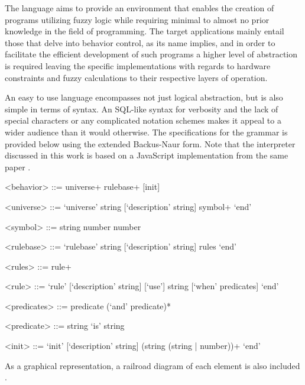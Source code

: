 The language aims to provide an environment that enables the creation of programs utilizing fuzzy logic while requiring minimal to almost no prior knowledge in the field of programming. The target applications mainly entail those that delve into behavior control, as its name implies, and in order to facilitate the efficient development of such programs a higher level of abstraction is required leaving the specific implementations with regards to hardware constraints and fuzzy calculations to their respective layers of operation.

An easy to use language encompasses not just logical abstraction, but is also simple in terms of syntax.
An SQL-like syntax for verbosity and the lack of special characters or any complicated notation schemes makes it appeal to a wider audience than it would otherwise. The specifications for the grammar is provided below using the extended Backus-Naur form. Note that the interpreter discussed in this work is based on a JavaScript implementation from the same paper \cite{pillerkovacs2015}.

\begin{grammar}
<behavior> ::= universe+ rulebase+ [init]

<universe> ::= `universe' string [`description' string] symbol+ `end'

<symbol> ::= string number number

<rulebase> ::= `rulebase' string [`description' string] rules `end'

<rules> ::= rule+

<rule> ::= `rule' [`description' string] [`use'] string [`when' predicates] `end'

<predicates> ::= predicate (`and' predicate)*

<predicate> ::= string `is' string

<init> ::= `init' [`description' string] (string (string | number))+ `end'
\end{grammar}

As a graphical representation, a railroad diagram of each element is also included \cite{pillerkovacs2015}.

